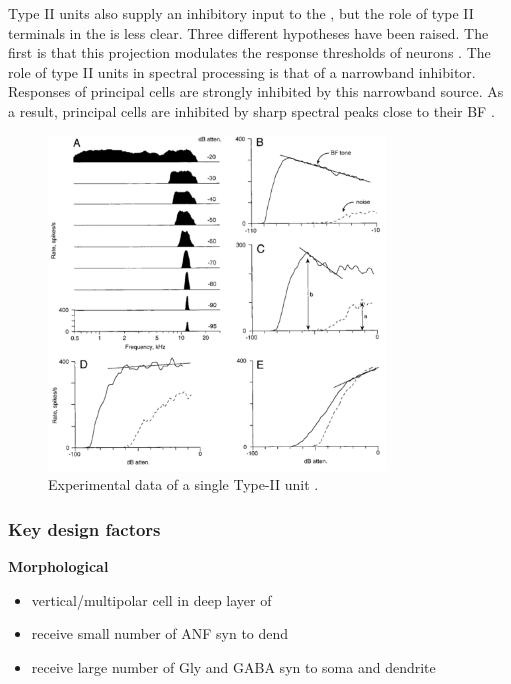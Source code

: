 Type II units also supply an inhibitory input to the \VCN
\citep{WickesbergOertel:1990}, but the role of type II terminals in the \VCN is
less clear. Three different hypotheses have been raised. The ﬁrst is that this
projection modulates the response thresholds of \VCN neurons
\citep{PaoliniClark:1998}.  The role of type II units in spectral processing is
that of a narrowband inhibitor. Responses of \DCN principal cells are strongly
inhibited by this narrowband source. As a result, \DCN principal cells are
inhibited by sharp spectral peaks close to their BF
\citep{SpirouDavisEtAl:1999}.

\begin{figure}[htb]
  \centering
\includegraphics[keepaspectratio,width=0.8\textwidth]{./gfx/Spirou-Fig1-type2}
\caption{Experimental data of a single Type-II \DCN unit \citep[Fig.~1]{SpirouDavisEtAl:1999}.}
  \label{fig:SpirouFig1}
\end{figure}


\subsubsection{Key design factors}


\textbf{Morphological}
\begin{itemize}
\item vertical/multipolar cell in deep layer of \DCN \citep{Rhode:1999}
\item receive small number of ANF syn to dend
\item receive large number of Gly and GABA syn to soma and dendrite
\end{itemize}





